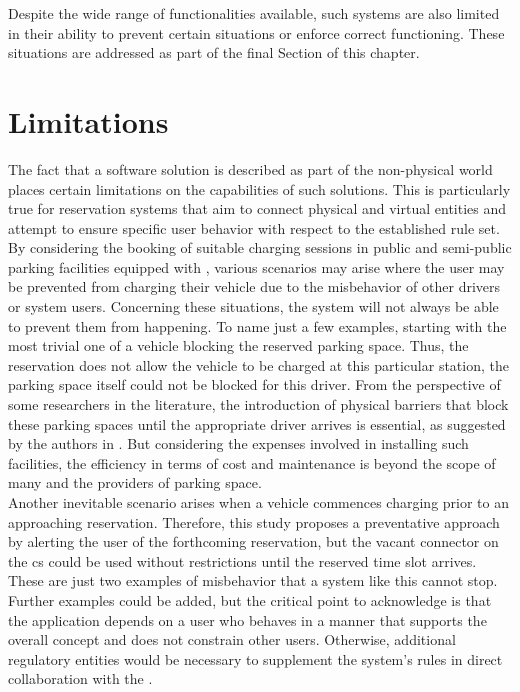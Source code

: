 \noindent Despite the wide range of functionalities available, such systems are also limited in their ability to prevent certain situations or enforce correct functioning. These situations are addressed as part of the final Section of this chapter.

\section{Limitations}
\label{ch:Analysis and Validation:sec:Limitations}

The fact that a software solution is described as part of the non-physical world places certain limitations on the capabilities of such solutions. 
This is particularly true for reservation systems that aim to connect physical and virtual entities and attempt to ensure specific user behavior with respect to the established rule set.
By considering the booking of suitable charging sessions in public and semi-public parking facilities equipped with , various scenarios may arise where the user may be prevented from charging their vehicle due to the misbehavior of other drivers or system users. 
Concerning these situations, the system will not always be able to prevent them from happening.
To name just a few examples, starting with the most trivial one of a vehicle blocking the reserved parking space. Thus, the reservation does not allow the vehicle to be charged at this particular station, the parking space itself could not be blocked for this driver.
From the perspective of some researchers in the literature, the introduction of physical barriers that block these parking spaces until the appropriate driver arrives is essential, as suggested by the authors in \cite{basmadjian_reference_2020}.
But considering the expenses involved in installing such facilities, the efficiency in terms of cost and maintenance is beyond the scope of many  and the providers of parking space. \\
Another inevitable scenario arises when a vehicle commences charging prior to an approaching reservation. Therefore, this study proposes a preventative approach by alerting the user of the forthcoming reservation, but the vacant connector on the \acrshort{cs} could be used without restrictions until the reserved time slot arrives.
These are just two examples of misbehavior that a system like this cannot stop. Further examples could be added, but the critical point to acknowledge is that the application depends on a user who behaves in a manner that supports the overall concept and does not constrain other users.
Otherwise, additional regulatory entities would be necessary to supplement the system's rules in direct collaboration with the .
